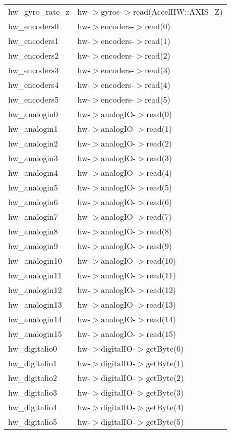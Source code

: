 \begin{center}
\begin{longtable}{|l|l|}
      hw\_gyro\_rate\_z & hw-$>$gyros-$>$read(AccelHW::AXIS\_Z)\\
      hw\_encoders0 & hw-$>$encoders-$>$read(0)\\
      hw\_encoders1 & hw-$>$encoders-$>$read(1)\\
      hw\_encoders2 & hw-$>$encoders-$>$read(2)\\
      hw\_encoders3 & hw-$>$encoders-$>$read(3)\\
      hw\_encoders4 & hw-$>$encoders-$>$read(4)\\
      hw\_encoders5 & hw-$>$encoders-$>$read(5)\\
      hw\_analogin0 & hw-$>$analogIO-$>$read(0)\\
      hw\_analogin1 & hw-$>$analogIO-$>$read(1)\\
      hw\_analogin2 & hw-$>$analogIO-$>$read(2)\\
      hw\_analogin3 & hw-$>$analogIO-$>$read(3)\\
      hw\_analogin4 & hw-$>$analogIO-$>$read(4)\\
      hw\_analogin5 & hw-$>$analogIO-$>$read(5)\\
      hw\_analogin6 & hw-$>$analogIO-$>$read(6)\\
      hw\_analogin7 & hw-$>$analogIO-$>$read(7)\\
      hw\_analogin8 & hw-$>$analogIO-$>$read(8)\\
      hw\_analogin9 & hw-$>$analogIO-$>$read(9)\\
      hw\_analogin10 & hw-$>$analogIO-$>$read(10)\\
      hw\_analogin11 & hw-$>$analogIO-$>$read(11)\\
      hw\_analogin12 & hw-$>$analogIO-$>$read(12)\\
      hw\_analogin13 & hw-$>$analogIO-$>$read(13)\\
      hw\_analogin14 & hw-$>$analogIO-$>$read(14)\\
      hw\_analogin15 & hw-$>$analogIO-$>$read(15)\\
      hw\_digitalio0 & hw-$>$digitalIO-$>$getByte(0)\\
      hw\_digitalio1 & hw-$>$digitalIO-$>$getByte(1)\\
      hw\_digitalio2 & hw-$>$digitalIO-$>$getByte(2)\\
      hw\_digitalio3 & hw-$>$digitalIO-$>$getByte(3)\\
      hw\_digitalio4 & hw-$>$digitalIO-$>$getByte(4)\\
      hw\_digitalio5 & hw-$>$digitalIO-$>$getByte(5)\\

\end{longtable}
\end{center}
